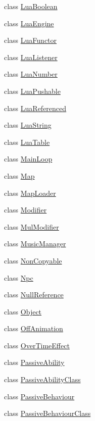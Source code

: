 \begin{DoxyCompactItemize}
\item 
class \hyperlink{classZeta_1_1LuaBoolean}{Lua\+Boolean}
\item 
class \hyperlink{classZeta_1_1LuaEngine}{Lua\+Engine}
\item 
class \hyperlink{classZeta_1_1LuaFunctor}{Lua\+Functor}
\item 
class \hyperlink{classZeta_1_1LuaListener}{Lua\+Listener}
\item 
class \hyperlink{classZeta_1_1LuaNumber}{Lua\+Number}
\item 
class \hyperlink{classZeta_1_1LuaPushable}{Lua\+Pushable}
\item 
class \hyperlink{classZeta_1_1LuaReferenced}{Lua\+Referenced}
\item 
class \hyperlink{classZeta_1_1LuaString}{Lua\+String}
\item 
class \hyperlink{classZeta_1_1LuaTable}{Lua\+Table}
\item 
class \hyperlink{classZeta_1_1MainLoop}{Main\+Loop}
\item 
class \hyperlink{classZeta_1_1Map}{Map}
\item 
class \hyperlink{classZeta_1_1MapLoader}{Map\+Loader}
\item 
class \hyperlink{classZeta_1_1Modifier}{Modifier}
\item 
class \hyperlink{classZeta_1_1MulModifier}{Mul\+Modifier}
\item 
class \hyperlink{classZeta_1_1MusicManager}{Music\+Manager}
\item 
class \hyperlink{classZeta_1_1NonCopyable}{Non\+Copyable}
\item 
class \hyperlink{classZeta_1_1Npc}{Npc}
\item 
class \hyperlink{classZeta_1_1NullReference}{Null\+Reference}
\item 
class \hyperlink{classZeta_1_1Object}{Object}
\item 
class \hyperlink{classZeta_1_1OffAnimation}{Off\+Animation}
\item 
class \hyperlink{classZeta_1_1OverTimeEffect}{Over\+Time\+Effect}
\item 
class \hyperlink{classZeta_1_1PassiveAbility}{Passive\+Ability}
\item 
class \hyperlink{classZeta_1_1PassiveAbilityClass}{Passive\+Ability\+Class}
\item 
class \hyperlink{classZeta_1_1PassiveBehaviour}{Passive\+Behaviour}
\item 
class \hyperlink{classZeta_1_1PassiveBehaviourClass}{Passive\+Behaviour\+Class}

\end{DoxyCompactItemize}
